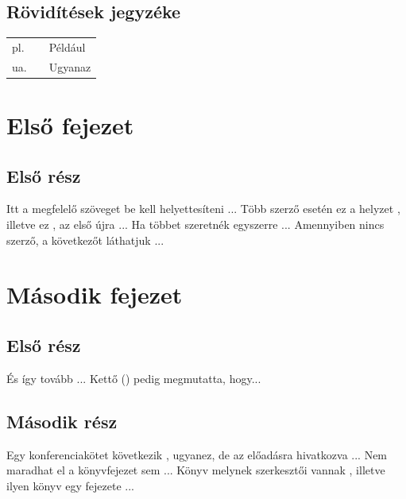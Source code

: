 \documentclass[a4paper, oneside, 12pt]{memoir}
\begin{document}
\setcounter{tocdepth}{3}
\tableofcontents


\newpage
 
\section*{Rövidítések jegyzéke}
\begin{tabular}{lp{0.2cm}l}
pl. && Például \\
ua. && Ugyanaz
\end{tabular}
\newpage


\chapter{Első fejezet}
\section{Első rész}
Itt a megfelelő szöveget be kell helyettesíteni \parencite{madeuparticle}...
Több szerző esetén ez a helyzet \parencite{kettoszerzo}, illetve ez \parencite{haromszerzo}, az első újra \parencite{masodik}...
Ha többet szeretnék egyszerre \parencite{kettoszerzo, madeuparticle}...
Amennyiben nincs szerző, a következőt láthatjuk \parencite{noauthor}...

\chapter{Második fejezet}
\section{Első rész}
És így tovább \parencite{madeupbook}...
Kettő (\citeyear{madeupbook}) pedig megmutatta, hogy...

\section{Második rész}
Egy konferenciakötet következik \parencite{conf}, ugyanez, de az előadásra hivatkozva \parencite{inconf}...
Nem maradhat el a könyvfejezet sem \parencite{inbook}...
Könyv melynek szerkesztői vannak \parencite{editbook}, illetve ilyen könyv egy fejezete \parencite{editinbook}...
\end{document}
